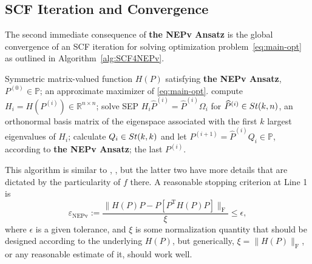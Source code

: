 \documentclass[11pt]{article}
\def\bbP{\mathbb{P}}
\def\bbR{\mathbb{R}}
\def\scrH{\mathscr{H}}
\def\what{\widehat}
\newcommand\STM[2]{{\rm St}(#1,#2)}
\DeclareMathOperator{\sym}{sym}
\DeclareMathOperator{\F}{F}
\DeclareMathOperator{\T}{T}
\DeclareMathOperator{\KKT}{KKT}
\DeclareMathOperator{\NEPv}{NEPv}
\theoremstyle{definition}
\numberwithin{equation}{section}
\begin{document}
\subsection{SCF Iteration and Convergence}\label{ssec:SCF4NEPv}
The second immediate consequence of {\bf the NEPv Ansatz} is the global convergence of an SCF iteration
for solving optimization problem~\eqref{eq:main-opt} as outlined in Algorithm~\ref{alg:SCF4NEPv}.
%
\begin{algorithm}[t]
\caption{NEPvSCF: NEPv \eqref{eq:NEPv-form} solved by SCF} \label{alg:SCF4NEPv}
\begin{algorithmic}[1]
\REQUIRE Symmetric matrix-valued function $H(P)$  satisfying {\bf the NEPv Ansatz}, $P^{(0)}\in\bbP$;
\ENSURE  an approximate maximizer of \eqref{eq:main-opt}. %
    \STATE compute $H_i=H(P^{(i)})\in\bbR^{n\times n}$;
    \STATE solve SEP $H_i\what P^{(i)}=\what P^{(i)}\Omega_i$ for $\what P^{(i)}\in\STM{k}{n}$,
           an orthonormal basis matrix of the eigenspace associated with the first $k$ largest eigenvalues of $H_i$;
    \STATE calculate $Q_i\in\STM{k}{k}$ and let $P^{(i+1)}=\what P^{(i)}Q_i\in\bbP$, according to {\bf the NEPv Ansatz};
\ENDFOR
\RETURN the last $P^{(i)}$.
\end{algorithmic}
\end{algorithm}
%
This algorithm is similar to \cite[Algorithm 2]{zhwb:2022}, \cite[Algorithm 4.1]{wazl:2023},
but the latter two have more details that are dictated by
the particularity of $f$ there. A reasonable stopping criterion at Line 1 is
         \begin{equation}\label{eq:stop-NEPv}
         \varepsilon_{\NEPv}:=\frac {\|H(P)P-P[P^{\T}H(P)P]\|_{\F}}{\xi}\le\epsilon,
         \end{equation}
         where $\epsilon$ is a given tolerance, and $\xi$ is some normalization quantity that should be
         designed according to the underlying $H(P)$, but generically, $\xi=\|H(P)\|_{\F}$, or any reasonable estimate of it,
         should work well.
\end{document}
